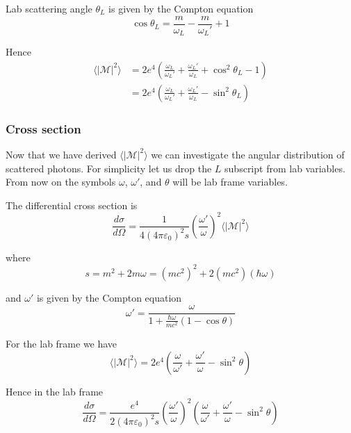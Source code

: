 Lab scattering angle $\theta_L$ is given by the Compton equation
\begin{equation*}
\cos\theta_L=\frac{m}{\omega_L}-\frac{m}{\omega_L'}+1
\end{equation*}

Hence
\begin{align*}
\langle|\mathcal{M}|^2\rangle
&=2e^4\left(
\frac{\omega_L}{\omega_L'}+\frac{\omega_L'}{\omega_L}+\cos^2\theta_L-1
\right)
\\
&=2e^4\left(
\frac{\omega_L}{\omega_L'}+\frac{\omega_L'}{\omega_L}-\sin^2\theta_L
\right)
\end{align*}

\subsubsection*{Cross section}
Now that we have derived $\langle|\mathcal{M}|^2\rangle$
we can investigate the angular distribution of scattered photons.
For simplicity let us drop the $L$ subscript from lab variables.
From now on the symbols $\omega$, $\omega'$, and $\theta$ will be lab frame variables.

\bigskip
The differential cross section is
\begin{equation*}
\frac{d\sigma}{d\Omega}=\frac{1}{4(4\pi\varepsilon_0)^2s}
\left(\frac{\omega'}{\omega}\right)^2\langle|\mathcal{M}|^2\rangle
\end{equation*}

where
\begin{equation*}
s=m^2+2m\omega=(mc^2)^2+2(mc^2)(\hbar\omega)
\end{equation*}

and $\omega'$ is given by the Compton equation
\begin{equation*}
\omega'=\frac{\omega}{1+\frac{\hbar\omega}{mc^2}(1-\cos\theta)}
\end{equation*}

For the lab frame we have
\begin{equation*}
\langle|\mathcal{M}|^2\rangle
=2e^4\left(
\frac{\omega}{\omega'}+\frac{\omega'}{\omega}-\sin^2\theta
\right)
\end{equation*}

Hence in the lab frame
\begin{equation*}
\frac{d\sigma}{d\Omega}
=\frac{e^4}{2(4\pi\varepsilon_0)^2s}
\left(\frac{\omega'}{\omega}\right)^2
\left(
\frac{\omega}{\omega'}+\frac{\omega'}{\omega}-\sin^2\theta
\right)
\end{equation*}

